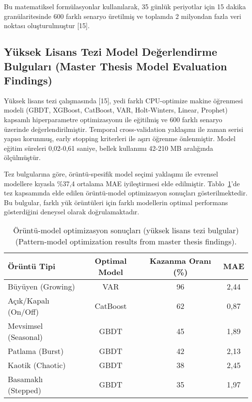\documentclass[12pt,a4paper]{article}
\begin{document}
Bu matematiksel formülasyonlar kullanılarak, 35 günlük periyotlar için 15 dakika granülaritesinde 600 farklı senaryo üretilmiş ve toplamda 2 milyondan fazla veri noktası oluşturulmuştur [15].

\subsection{Yüksek Lisans Tezi Model Değerlendirme Bulguları (Master Thesis Model Evaluation Findings)}

Yüksek lisans tezi çalışmasında [15], yedi farklı CPU-optimize makine öğrenmesi modeli (GBDT, XGBoost, CatBoost, VAR, Holt-Winters, Linear, Prophet) kapsamlı hiperparametre optimizasyonu ile eğitilmiş ve 600 farklı senaryo üzerinde değerlendirilmiştir. Temporal cross-validation yaklaşımı ile zaman serisi yapısı korunmuş, early stopping kriterleri ile aşırı öğrenme önlenmiştir. Model eğitim süreleri 0,02-0,61 saniye, bellek kullanımı 42-210 MB aralığında ölçülmüştür.

Tez bulgularına göre, örüntü-spesifik model seçimi yaklaşımı ile evrensel modellere kıyasla \%37,4 ortalama MAE iyileştirmesi elde edilmiştir. Tablo~\ref{tab:pattern-model}'de tez kapsamında elde edilen örüntü-model optimizasyon sonuçları gösterilmektedir. Bu bulgular, farklı yük örüntüleri için farklı modellerin optimal performans gösterdiğini deneysel olarak doğrulamaktadır.

\begin{table}[h]
    \centering
    \caption{Örüntü-model optimizasyon sonuçları (yüksek lisans tezi bulgular) (Pattern-model optimization results from master thesis findings).}
    \label{tab:pattern-model}
    \begin{tabular}{@{}lccc@{}}
        \toprule
        Örüntü Tipi & Optimal Model & Kazanma Oranı (\%) & MAE \\
        \midrule
        Büyüyen (Growing) & VAR & 96 & 2,44 \\
        Açık/Kapalı (On/Off) & CatBoost & 62 & 0,87 \\
        Mevsimsel (Seasonal) & GBDT & 45 & 1,89 \\
        Patlama (Burst) & GBDT & 42 & 2,13 \\
        Kaotik (Chaotic) & GBDT & 38 & 2,45 \\
        Basamaklı (Stepped) & GBDT & 35 & 1,97 \\
        \bottomrule
    \end{tabular}
\end{table}
\end{document}
